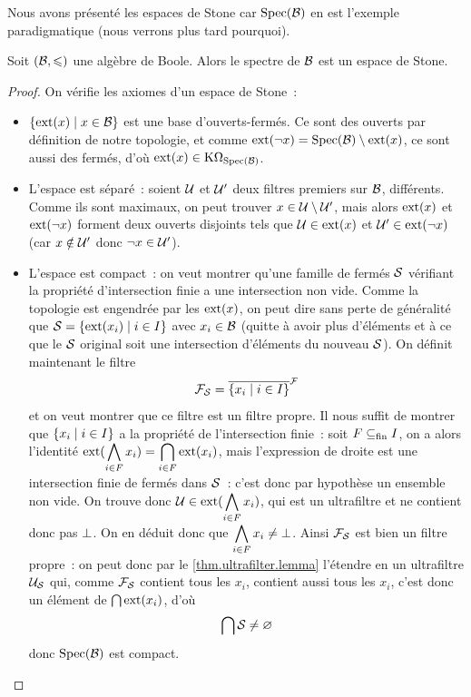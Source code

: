 \noindent
Nous avons présenté les espaces de Stone car $\operatorname{Spec}(\mathcal{B})$ en est l'exemple
paradigmatique (nous verrons plus tard pourquoi).

\begin{property}
  Soit $(\mathcal{B},\leqslant)$ une algèbre de Boole. Alors le spectre de $\mathcal{B}$ est
  un espace de Stone.
\end{property}

\begin{proof}
  On vérifie les axiomes d'un espace de Stone~:
  \begin{itemize}
  \item $\left\{ \operatorname{ext}(x) \;\middle\vert\; x \in \mathcal{B} \right\}$ est une base d'ouverts-fermés. Ce sont
    des ouverts par définition de notre topologie, et comme
    $\operatorname{ext}(\lnot x)=\operatorname{Spec}(\mathcal{B})\setminus\operatorname{ext}(x)$, ce sont aussi des fermés,
    d'où $\operatorname{ext}(x)\in \mathrm{K}\Omega_{\operatorname{Spec}(\mathcal{B})}$.
  \item L'espace est séparé~: soient $\mathcal{U}$ et $\mathcal{U}'$ deux filtres
    premiers sur $\mathcal{B}$, différents. Comme ils sont maximaux, on peut trouver
    $x\in \mathcal{U}\setminus \mathcal{U}'$, mais alors $\operatorname{ext}(x)$ et
    $\operatorname{ext}(\lnot x)$ forment deux ouverts disjoints tels que
    $\mathcal{U} \in\operatorname{ext}(x)$ et $\mathcal{U}' \in\operatorname{ext}(\lnot x)$
    (car $x\notin\mathcal{U}'$ donc $\lnot x \in \mathcal{U}'$).
  \item L'espace est compact~: on veut montrer qu'une famille de fermés
    $\mathcal S$ vérifiant la propriété d'intersection finie a une
    intersection non vide. Comme la topologie est engendrée par les $\operatorname{ext}(x)$,
    on peut dire sans perte de généralité que
    $\mathcal S = \left\{ \operatorname{ext}(x_i) \;\middle\vert\; i\in I \right\}$ avec $x_i \in \mathcal{B}$ (quitte à
    avoir plus d'éléments et à ce que le $\mathcal S$ original soit une
    intersection d'éléments du nouveau $\mathcal S$). On définit maintenant le
    filtre
    \[\mathcal{F}_{\mathcal S} = \overline{\left\{ x_i \;\middle\vert\; i \in I \right\}}^{\mathcal{F}}\]
    et on veut montrer que ce filtre est un filtre propre. Il nous suffit de
    montrer que $\left\{ x_i \;\middle\vert\; i \in I \right\}$ a la propriété de l'intersection finie~:
    soit $F\subseteq_{\mathrm{fin}} I$, on a alors l'identité
    $\displaystyle\operatorname{ext}(\bigwedge_{i \in F} x_i) = \bigcap_{i \in F}\operatorname{ext}(x_i)$,
    mais l'expression de droite est une intersection finie de fermés dans
    $\mathcal S$~: c'est donc par hypothèse un ensemble non vide. On trouve
    donc $\mathcal{U} \in \displaystyle\operatorname{ext}(\bigwedge_{i\in F} x_i)$, qui est un
    ultrafiltre et ne contient donc pas $\bot$. On en déduit donc que
    $\displaystyle\bigwedge_{i \in F} x_i \neq \bot$. Ainsi
    $\mathcal{F}_{\mathcal S}$ est bien un filtre propre~: on peut donc par le
    \cref{thm.ultrafilter.lemma} l'étendre en un ultrafiltre
    $\mathcal{U}_{\mathcal S}$ qui, comme $\mathcal{F}_{\mathcal S}$ contient tous les
    $x_i$, contient aussi tous les $x_i$, c'est donc un élément de
    $\bigcap \operatorname{ext}(x_i)$, d'où
    \[\bigcap \mathcal S \neq \varnothing\]
    donc $\operatorname{Spec}(\mathcal{B})$ est compact.\qedhere
  \end{itemize}
\end{proof}

